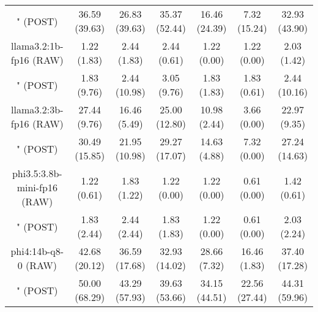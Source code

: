 \begin{table}[]
{\begin{tabular}{ccccccc}
        

        \multicolumn{1}{c|}{" (POST)} & 36.59 (39.63) & 26.83 (39.63) & \multicolumn{1}{c|}{35.37 (52.44)} & 16.46 (24.39) & \multicolumn{1}{c|}{7.32 (15.24)} & 32.93 (43.90) \\
        \cline{1-7}
        

        \multicolumn{1}{c|}{llama3.2:1b-fp16 (RAW)} & 1.22 (1.83) & 2.44 (1.83) & \multicolumn{1}{c|}{2.44 (0.61)} & 1.22 (0.00) & \multicolumn{1}{c|}{1.22 (0.00)} & 2.03 (1.42) \\
        
        

        \multicolumn{1}{c|}{" (POST)} & 1.83 (9.76) & 2.44 (10.98) & \multicolumn{1}{c|}{3.05 (9.76)} & 1.83 (1.83) & \multicolumn{1}{c|}{1.83 (0.61)} & 2.44 (10.16) \\
        \cline{1-7}
        

        \multicolumn{1}{c|}{llama3.2:3b-fp16 (RAW)} & 27.44 (9.76) & 16.46 (5.49) & \multicolumn{1}{c|}{25.00 (12.80)} & 10.98 (2.44) & \multicolumn{1}{c|}{3.66 (0.00)} & 22.97 (9.35) \\
        
        

        \multicolumn{1}{c|}{" (POST)} & 30.49 (15.85) & 21.95 (10.98) & \multicolumn{1}{c|}{29.27 (17.07)} & 14.63 (4.88) & \multicolumn{1}{c|}{7.32 (0.00)} & 27.24 (14.63) \\
        \cline{1-7}
        

        \multicolumn{1}{c|}{phi3.5:3.8b-mini-fp16 (RAW)} & 1.22 (0.61) & 1.83 (1.22) & \multicolumn{1}{c|}{1.22 (0.00)} & 1.22 (0.00) & \multicolumn{1}{c|}{0.61 (0.00)} & 1.42 (0.61) \\
        
        

        \multicolumn{1}{c|}{" (POST)} & 1.83 (2.44) & 2.44 (2.44) & \multicolumn{1}{c|}{1.83 (1.83)} & 1.22 (0.00) & \multicolumn{1}{c|}{0.61 (0.00)} & 2.03 (2.24) \\
        \cline{1-7}
        

        \multicolumn{1}{c|}{phi4:14b-q8-0 (RAW)} & 42.68 (20.12) & 36.59 (17.68) & \multicolumn{1}{c|}{32.93 (14.02)} & 28.66 (7.32) & \multicolumn{1}{c|}{16.46 (1.83)} & 37.40 (17.28) \\
        
        

        \multicolumn{1}{c|}{" (POST)} & 50.00 (68.29) & 43.29 (57.93) & \multicolumn{1}{c|}{39.63 (53.66)} & 34.15 (44.51) & \multicolumn{1}{c|}{22.56 (27.44)} & 44.31 (59.96) \\
        \cline{1-7}
        


\end{tabular}}
\end{table}
